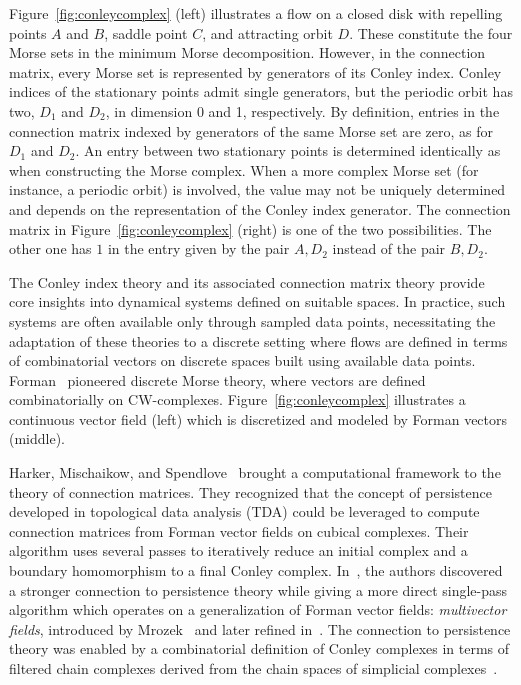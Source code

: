 \documentclass[a4paper,english,cleveref]{article}
\theoremstyle{plain}
\newcounter{li}
\begin{document}
Figure~\ref{fig:conleycomplex} (left) illustrates a flow on a closed disk with repelling points $A$ and $B$, saddle point $C$, and attracting orbit $D$. 
These constitute the four Morse sets in the minimum Morse decomposition. 
However, in the connection matrix, every Morse set is represented by generators of its Conley index. 
Conley indices of the stationary points admit single generators, but the periodic orbit has two, $D_1$ and $D_2$, in dimension 0 and 1, respectively.
By definition, entries in the connection matrix indexed by generators of the same Morse set are zero, as for $D_1$ and $D_2$. 
An entry between two stationary points is determined identically as when constructing the Morse complex. 
When a more complex Morse set (for instance, a periodic orbit) is involved, the value may not be uniquely determined and depends on the representation of the Conley index generator.
The connection matrix in Figure~\ref{fig:conleycomplex} (right) is one of the two possibilities.
The other one has $1$ in the entry given by the pair $A,D_2$ instead of the pair $B,D_2$.


The Conley index theory and its associated connection matrix theory provide core insights into dynamical systems defined on suitable spaces. In practice, such systems are often available only through sampled data points, necessitating the adaptation of these theories to a discrete setting where flows are defined in terms of combinatorial vectors on discrete spaces built using available data points. Forman~\cite{Forman1998a} pioneered discrete Morse theory, where vectors are defined combinatorially on CW-complexes. Figure~\ref{fig:conleycomplex} illustrates a continuous vector field (left) which is discretized and modeled by Forman vectors (middle).

Harker, Mischaikow, and Spendlove~\cite{HMS2021,HMS2021a} brought a computational framework to the theory of connection matrices. They recognized that the concept of persistence developed in topological data analysis (TDA) could be leveraged to compute connection matrices from Forman vector fields on cubical complexes. Their algorithm uses several passes to iteratively reduce an initial complex and a boundary homomorphism to a final Conley complex. In~\cite{DLMS24}, the authors discovered a stronger connection to persistence theory while giving a more
direct single-pass algorithm which operates on a generalization of Forman vector fields: \emph{multivector fields}, introduced by Mrozek~\cite{Mr2017} and later refined in~\cite{LKMW2022}. 
The connection to persistence theory was enabled by a combinatorial definition of Conley complexes 
in terms of filtered chain complexes derived from the chain spaces of simplicial complexes~\cite{MW2021b}.
\end{document}
